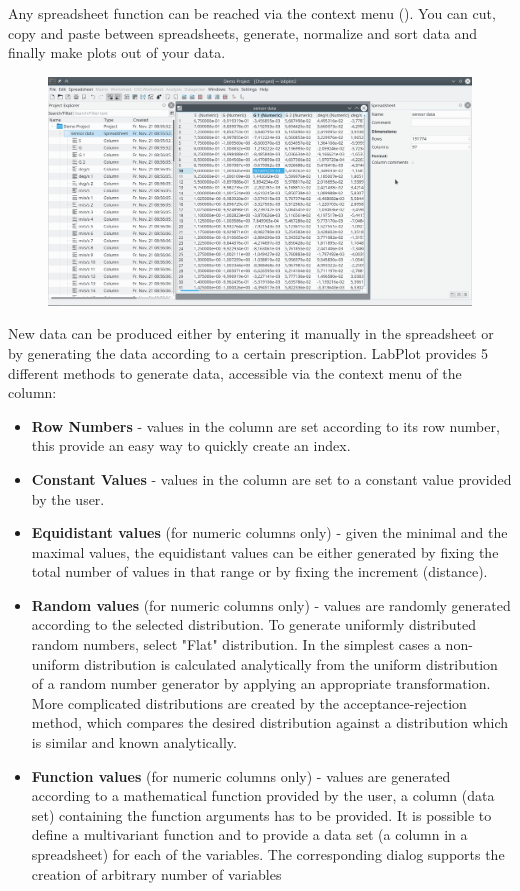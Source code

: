 Any spreadsheet function can be reached via the context menu (\rmb).
You can cut, copy and paste between spreadsheets, generate, normalize and sort data and finally make plots out of your data.
\begin{figure}
\includegraphics[width=\textwidth]{images/spreadsheet.png}
\end{figure}

New data can be produced either by entering it manually in the spreadsheet or by generating the data according to a certain prescription.
LabPlot provides 5 different methods to generate data, accessible via the context menu of the column:
\begin{itemize}
\item \textbf{Row Numbers} - values in the column are set according to its row number, this provide an easy way to quickly create an index.
%
\item \textbf{Constant Values} - values in the column are set to a constant value provided by the user.
%
\item \textbf{Equidistant values} (for numeric columns only) - given the minimal and the maximal values, the equidistant values can be either generated 
by fixing the total number of values in that range or by fixing the increment (distance).
%
\item \textbf{Random values} (for numeric columns only) - values are randomly generated according to the selected distribution.
To generate uniformly distributed random numbers, select "Flat" distribution.
In the simplest cases a non-uniform distribution is calculated analytically from the uniform distribution of a random number generator by applying
an appropriate transformation. More complicated distributions are created by the acceptance-rejection method, which compares the desired distribution
against a distribution which is similar and known analytically.
%
\item \textbf{Function values} (for numeric columns only) - values are generated according to a mathematical function provided by the user, 
a column (data set) containing the function arguments has to be provided.
It is possible to define a multivariant function and to provide a data set (a column in a spreadsheet) for each of the variables.
The corresponding dialog supports the creation of arbitrary number of variables
\end{itemize}

